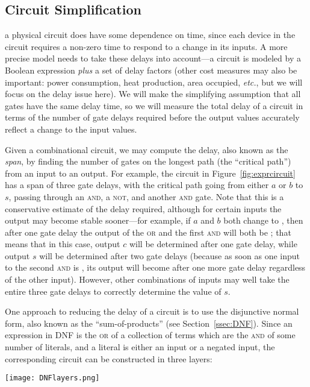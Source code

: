 \subsection{Circuit Simplification}\label{sec:circsimp}
 a physical circuit does have some dependence on time, since each device in the circuit requires a non-zero time to respond to a change in its inputs. A more precise model needs to take these delays into account---a circuit is modeled by a Boolean expression \emph{plus} a set of delay factors (other cost measures may also be important: power consumption, heat production, area occupied, \textit{etc.}, but we will focus on the delay issue here). We will make the simplifying assumption that all gates have the same delay time, so we will measure the total delay of a circuit in terms of the number of gate delays required before the output values accurately reflect a change to the input values.

Given a combinational circuit, we may compute the delay, also known as the \textit{span}, by finding the number of gates on the longest path (the ``critical path'') from an input to an output. For example, the circuit in Figure~\ref{fig:exprcircuit} has a span of three gate delays, with the critical path going from either $a$ or $b$ to $s$, passing through an \textsc{and}, a \textsc{not}, and another \textsc{and} gate. Note that this is a conservative estimate of the delay required, although for certain inputs the output may become stable sooner---for example, if $a$ and $b$ both change to \0, then after one gate delay the output of the \textsc{or} and the first \textsc{and} will both be \0; that means that in this case, output $c$ will be determined after one gate delay, while output $s$ will be determined after two gate delays (because as soon as one input to the second \textsc{and} is \0, its output will become \0 after one more gate delay regardless of the other input). However, other combinations of inputs may well take the entire three gate delays to correctly determine the value of $s$.

One approach to reducing the delay of a circuit is to use the disjunctive normal form, also known as the ``sum-of-products'' (see Section~\ref{ssec:DNF}). Since an expression in DNF is the \textsc{or} of a collection of terms which are the \textsc{and} of some number of literals, and a literal is either an input or a negated input, the corresponding circuit can be constructed in three layers:
\begin{center}
\texttt{[image: DNFlayers.png]}
\end{center}

